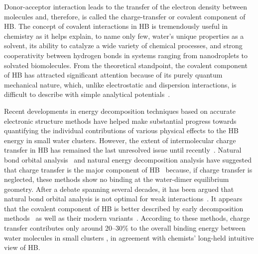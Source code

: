 \documentclass[aps,prl,reprint,amsmath,amssymb]{revtex4-1}
\begin{document}
Donor-acceptor interaction leads to the transfer of the electron density between molecules and, therefore, is called the charge-transfer or covalent component of HB. 
The concept of covalent interactions in HB is tremendously useful in chemistry 
as it helps explain, to name only few, water's unique properties as a solvent, its ability to catalyze a wide variety of chemical processes, and strong cooperativity between hydrogen bonds in systems ranging from nanodroplets to solvated biomolecules. 
From the theoretical standpoint, the covalent component of HB has attracted significant attention because of its purely quantum mechanical nature, which, unlike electrostatic and dispersion interactions, is difficult to describe with simple analytical potentials~\cite{lee2011effects, gordon2013accurate}.



Recent developments in energy decomposition techniques based on accurate electronic structure methods have helped make substantial progress towards quantifying the individual contributions of various physical effects to the HB energy in small water clusters. 
However, the extent of intermolecular charge transfer in HB has remained the last unresolved issue until recently~\cite{isaacs1999covalency,ghanty2000hydrogen,stone2017natural}. 
Natural bond orbital analysis~\cite{weinhold1998natural} and natural energy decomposition analysis \cite{glendening1994natural} have suggested that charge transfer is the major component of HB~\cite{schenter1996natural,glendening2005natural,weinhold2005resonance} because, if charge transfer is neglected, these methods show no binding at the water-dimer equilibrium geometry. 
After a debate spanning several decades, it has been argued that natural bond orbital analysis is not optimal for weak interactions~\cite{stone2017natural}. 
It appears that the covalent component of HB is better described by early decomposition methods~\cite{kitaura1976new,bagus1984new,bagus1992decomposition,stevens1987frozen,chen1996energy,stone1993computation} as well as their modern variants~\cite{mo2000energy,misquitta2013charge,khaliullin2007unravelling,misquitta2013charge}. 
According to these methods, charge transfer contributes only around 20--30\% to the overall binding energy between water molecules in small clusters \cite{stevens1987frozen,stone1993computation,chen1996energy,piquemal2005csov,khaliullin2009electron,cobar2012examination}, in agreement with chemists' long-held intuitive view of HB.
\end{document}
